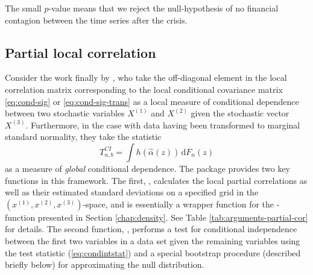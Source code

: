 
The small $p$-value means that we reject the null-hypothesis of no financial contagion between the time series after the crisis.

\subsection{Partial local correlation}
\label{chap:partial}

Consider the work finally by \citet{otne:tjos:2019}, who take the off-diagonal element in the local correlation matrix corresponding to the local conditional covariance matrix \eqref{eq:cond-sig} or \eqref{eq:cond-sig-trans} as a local measure of conditional dependence between two stochastic variables \(X^{\left(1\right)}\) and \(X^{\left(2\right)}\) given the stochastic vector \(X^{\left(3\right)}\). Furthermore, in the case with data having been transformed to marginal standard normality, they take the statistic
\begin{equation}
T^{CI}_{n, b} = \int h\left(\widehat\alpha\left(z\right)\right) \, \textrm{d}F_n\left(z\right)
\label{eq:condintstat}
\end{equation}
as a measure of \emph{global} conditional dependence. The  package provides two key functions in this framework. The first, , calculates the local partial correlations as well as their estimated standard deviations on a specified grid in the \(\left(x^{\left(1\right)}, x^{\left(2\right)}, x^{\left(3\right)}\right)\)-space, and is essentially a wrapper function for the -function presented in Section \ref{chap:density}. See Table \ref{tab:arguments-partial-cor} for details. The second function, , performs a test for conditional independence between the first two variables in a data set given the remaining variables using the test statistic (\ref{eq:condintstat}) and a special bootstrap procedure (described briefly below) for approximating the null distribution.

